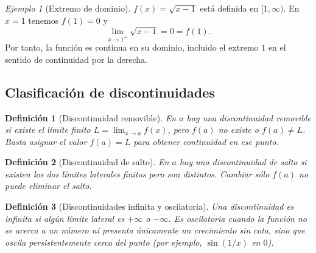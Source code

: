 \documentclass[12pt]{article}
\newtheorem{definicion}{Definición}[section]
\theoremstyle{remark}
\newtheorem{ejemplo}{Ejemplo}
\begin{document}
\begin{ejemplo}[Extremo de dominio]
$f(x)=\sqrt{x-1}$ está definida en $[1,\infty)$. En $x=1$ tenemos $f(1)=0$ y
\[
 \lim_{x\to1^+}\sqrt{x-1}=0=f(1).
\]
Por tanto, la función es continua en su dominio, incluido el extremo $1$ en el sentido de continuidad por la derecha.
\end{ejemplo}

\subsection*{Clasificación de discontinuidades}
\begin{definicion}[Discontinuidad removible]
En $a$ hay una discontinuidad \emph{removible} si existe el límite finito $L=\lim_{x\to a}f(x)$, pero $f(a)$ no existe o $f(a)\ne L$. Basta asignar el valor $f(a)=L$ para obtener continuidad en ese punto.
\end{definicion}

\begin{definicion}[Discontinuidad de salto]
En $a$ hay una discontinuidad de \emph{salto} si existen los dos límites laterales finitos pero son distintos. Cambiar sólo $f(a)$ no puede eliminar el salto.
\end{definicion}

\begin{definicion}[Discontinuidades infinita y oscilatoria]
Una discontinuidad es \emph{infinita} si algún límite lateral es $+\infty$ o $-\infty$. Es \emph{oscilatoria} cuando la función no se acerca a un número ni presenta únicamente un crecimiento sin cota, sino que oscila persistentemente cerca del punto (por ejemplo, $\sin(1/x)$ en $0$).
\end{definicion}

\begin{center}
\end{center}
\end{document}

